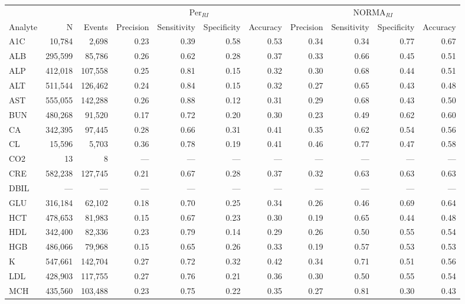 \begin{table}[ht]
\centering
\footnotesize
\begin{tabular}{lrrrrrrrrrr}
\toprule
 & &  & \multicolumn{4}{c}{Per$_{RI}$} & \multicolumn{4}{c}{NORMA$_{RI}$} \\
\cmidrule(lr){4-7} \cmidrule(lr){8-11}
Analyte & N & Events & Precision & Sensitivity & Specificity & Accuracy & Precision & Sensitivity & Specificity & Accuracy \\
\midrule
A1C & 10,784 & 2,698 & 0.23 & 0.39 & 0.58 & 0.53 & 0.34 & 0.34 & 0.77 & 0.67 \\
ALB & 295,599 & 85,786 & 0.26 & 0.62 & 0.28 & 0.37 & 0.33 & 0.66 & 0.45 & 0.51 \\
ALP & 412,018 & 107,558 & 0.25 & 0.81 & 0.15 & 0.32 & 0.30 & 0.68 & 0.44 & 0.51 \\
ALT & 511,544 & 126,462 & 0.24 & 0.84 & 0.15 & 0.32 & 0.27 & 0.65 & 0.43 & 0.48 \\
AST & 555,055 & 142,288 & 0.26 & 0.88 & 0.12 & 0.31 & 0.29 & 0.68 & 0.43 & 0.50 \\
BUN & 480,268 & 91,520 & 0.17 & 0.72 & 0.20 & 0.30 & 0.23 & 0.49 & 0.62 & 0.60 \\
CA & 342,395 & 97,445 & 0.28 & 0.66 & 0.31 & 0.41 & 0.35 & 0.62 & 0.54 & 0.56 \\
CL & 15,596 & 5,703 & 0.36 & 0.78 & 0.19 & 0.41 & 0.46 & 0.77 & 0.47 & 0.58 \\
CO2 & 13 & 8 & --- & --- & --- & --- & --- & --- & --- & --- \\
CRE & 582,238 & 127,745 & 0.21 & 0.67 & 0.28 & 0.37 & 0.32 & 0.63 & 0.63 & 0.63 \\
DBIL & --- & --- & --- & --- & --- & --- & --- & --- & --- & --- \\
GLU & 316,184 & 62,102 & 0.18 & 0.70 & 0.25 & 0.34 & 0.26 & 0.46 & 0.69 & 0.64 \\
HCT & 478,653 & 81,983 & 0.15 & 0.67 & 0.23 & 0.30 & 0.19 & 0.65 & 0.44 & 0.48 \\
HDL & 342,400 & 82,336 & 0.23 & 0.79 & 0.14 & 0.29 & 0.26 & 0.50 & 0.55 & 0.54 \\
HGB & 486,066 & 79,968 & 0.15 & 0.65 & 0.26 & 0.33 & 0.19 & 0.57 & 0.53 & 0.53 \\
K & 547,661 & 142,704 & 0.27 & 0.72 & 0.32 & 0.42 & 0.34 & 0.71 & 0.51 & 0.56 \\
LDL & 428,903 & 117,755 & 0.27 & 0.76 & 0.21 & 0.36 & 0.30 & 0.50 & 0.55 & 0.54 \\
MCH & 435,560 & 103,488 & 0.23 & 0.75 & 0.22 & 0.35 & 0.27 & 0.81 & 0.30 & 0.43 \\

\end{tabular}
\end{table}
